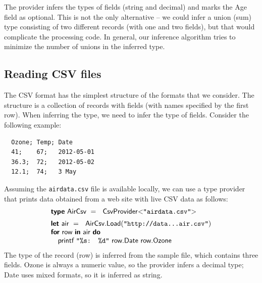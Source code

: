 \documentclass[10pt]{sigplanconf}
\newcommand{\kvd}[1]{\textbf{\sffamily #1}}
\newcommand{\ident}[1]{\textnormal{\sffamily #1}}
\newcommand{\str}[1]{\texttt{#1}}
\newcommand{\rangl}{\hspace{-0.3em}>\hspace{-0.25em}}
\newcommand{\langl}{\hspace{-0.25em}<\hspace{-0.3em}}
\begin{document}
The provider infers the types of fields (\ident{string} and \ident{decimal}) and marks the
\ident{Age} field as optional. This is not the only alternative -- we could infer a union
(sum) type consisting of two different records (with one and two fields), but that would 
complicate the processing code. In general, our inference algorithm tries to minimize the number
of unions in the inferred type.


\subsection{Reading CSV files}
\label{sec:structural-csv}

The CSV format has the simplest structure of the formats that we consider. The structure is a
collection of records with fields (with names specified by the first row). When inferring the type, 
we need to infer the type of fields. Consider the following example:
%
{\small
\begin{verbatim}
  Ozone; Temp; Date
  41;    67;   2012-05-01
  36.3;  72;   2012-05-02
  12.1;  74;   3 May
\end{verbatim}
}
%
\noindent
Assuming the \str{airdata.csv} file is available locally, we can use a type provider that prints 
data obtained from a web site with live CSV data as follows:
%
\begin{equation*}
\begin{array}{l}
\kvd{type}~\ident{AirCsv}~=~\ident{CsvProvider}\langl\str{"airdata.csv"}\rangl\hspace{1em} \\[0.5em]
\kvd{let}~\ident{air}~=~\ident{AirCsv.Load}(\str{"http://data...air.csv"})\\
\kvd{for}~\ident{row}~\kvd{in}~\ident{air}~\kvd{do}\\
\quad\ident{printf}~\str{"\%s: \%d"}~\ident{row.Date row.Ozone}\\
\end{array}
\end{equation*}
%
The type of the record (\ident{row}) is inferred from the sample file, which contains three
fields. Ozone is always a numeric value, so the provider infers a \ident{decimal} type; Date uses
mixed formats, so it is inferred as \ident{string}.
\end{document}
